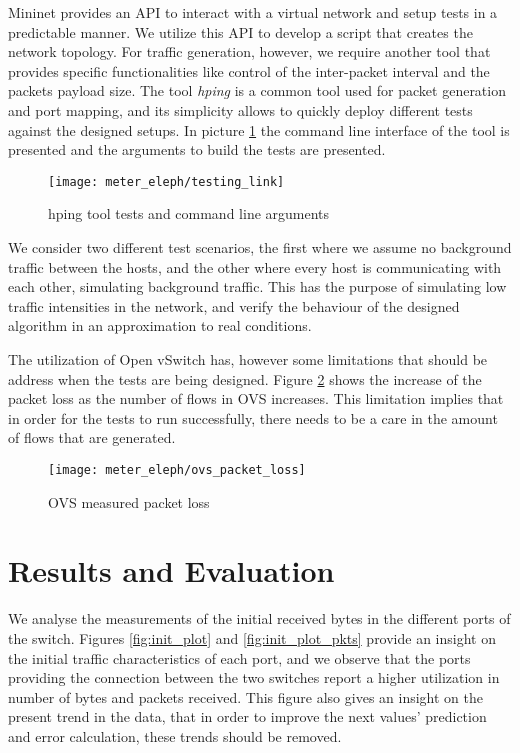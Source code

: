 Mininet provides an API to interact with a virtual network and setup tests in a predictable manner. We utilize this API to develop a script that creates the network
topology. For traffic generation, however, we require another tool that provides specific functionalities like control of the inter-packet interval and the packets 
payload size. The tool \textit{hping} is a common tool used for packet generation and port mapping, and its simplicity allows to quickly deploy different tests
against the designed setups. In picture \ref{fig:hping_setup} the command line interface of the tool is presented and the arguments to build the tests are presented.

\begin{figure}[H]
    \centering
    \texttt{[image: meter\_eleph/testing\_link]}
    \caption{hping tool tests and command line arguments}
    \label{fig:hping_setup}
\end{figure}

\par We consider two different test scenarios, the first where we assume no background traffic between the hosts, and the other where every host is communicating
with each other, simulating background traffic. This has the purpose of simulating low traffic intensities in the network, and verify the behaviour of the designed
algorithm in an approximation to real conditions.

\par The utilization of Open vSwitch has, however some limitations that should be address when the tests are being designed. Figure \ref{fig:ovs_packet_loss} shows
the increase of the packet loss as the number of flows in OVS increases. This limitation implies that in order for the tests to run successfully, there needs to be
a care in the amount of flows that are generated.

\begin{figure} [H]
    \centering
    \texttt{[image: meter\_eleph/ovs\_packet\_loss]}
    \caption {OVS measured packet loss}
    \label{fig:ovs_packet_loss}
\end{figure} 

\section {Results and Evaluation} \label{sec:change_results}

\par We analyse the measurements of the initial received bytes in the different ports of the switch. Figures \ref{fig:init_plot} and \ref{fig:init_plot_pkts} provide
an insight on the initial traffic characteristics of each port, and we observe that the ports providing the connection between the two switches report a higher
utilization in number of bytes and packets received. This figure also gives an insight on the present trend in the data, that in order to improve the next
values' prediction and error calculation, these trends should be removed.

